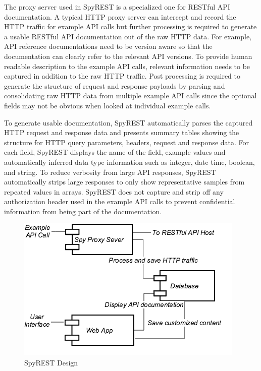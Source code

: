 \documentclass[conference]{IEEEtran}
\begin{document}
The proxy server used in SpyREST is a specialized one for RESTful API documentation. A typical HTTP proxy server can intercept and record the HTTP traffic for example API calls but further processing is required to generate a usable RESTful API documentation out of the raw HTTP data. For example, API reference documentations need to be version aware so that the documentation can clearly refer to the relevant API versions. To provide human readable description to the example API calls, relevant information needs to be captured in addition to the raw HTTP traffic. Post processing is required to generate the structure of request and response payloads by parsing and consolidating raw HTTP data from multiple example API calls since the optional fields may not be obvious when looked at individual example calls.

To generate usable documentation, SpyREST automatically parses the captured HTTP request and response data and presents summary tables showing the structure for HTTP query parameters, headers, request and response data. For each field, SpyREST displays the name of the field, example values and automatically inferred data type information such as integer, date time, boolean, and string. To reduce verbosity from large API responses, SpyREST automatically strips large responses to only show representative samples from repeated values in arrays. SpyREST does not capture and strip off any authorization header used in the example API calls to prevent confidential information from being part of the documentation.


\begin{figure}[tbh]
  \centering
  \includegraphics[width=\linewidth]{spyrest_components.png}
  \caption{SpyREST Design}
  \label{fig:components}
\end{figure}
\end{document}

